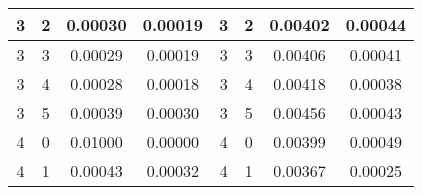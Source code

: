 \begin{table}[H]
\begin{tabular}{|c|c|c|c|c|c|c|c|}
3                                      & 2                                      & 0.00030                                                             & 0.00019                                                                 & 3                                      & 2                                     & 0.00402                                                             & 0.00044                                                                 \\ \hline
3                                      & 3                                      & 0.00029                                                             & 0.00019                                                                 & 3                                      & 3                                     & 0.00406                                                             & 0.00041                                                                 \\ \hline
3                                      & 4                                      & 0.00028                                                             & 0.00018                                                                 & 3                                      & 4                                     & 0.00418                                                             & 0.00038                                                                 \\ \hline
3                                      & 5                                      & 0.00039                                                             & 0.00030                                                                 & 3                                      & 5                                     & 0.00456                                                             & 0.00043                                                                 \\ \hline
4                                      & 0                                      & 0.01000                                                             & 0.00000                                                                 & 4                                      & 0                                     & 0.00399                                                             & 0.00049                                                                 \\ \hline
4                                      & 1                                      & 0.00043                                                             & 0.00032                                                                 & 4                                      & 1                                     & 0.00367                                                             & 0.00025                                                                 \\ \hline

\end{tabular}
\end{table}

